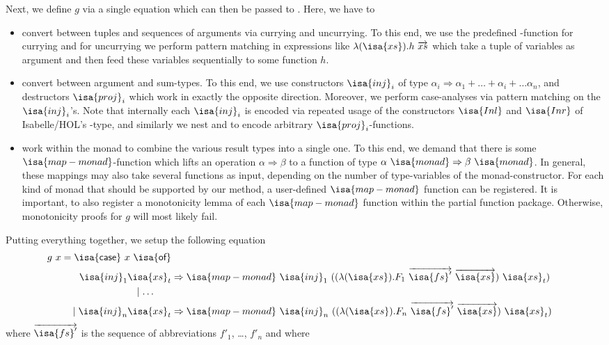\documentclass[11pt,a4paper]{article}
\newcommand\isakwd[1]{\textsf{\isa{#1}}}
\newcommand\parfun{\isakwd{partial-function}}
\newcommand\vect[1]{\overrightarrow{#1}}
\newcommand\fs{\isa{fs}}
\newcommand\xs{\isa{xs}}
\newcommand\xst{\isa{xs}_t}
\newcommand\cprod[1]{({#1})}
\newcommand\monad{\isa{monad}}
\newcommand\tto\Rightarrow
\newcommand\inj{\isa{inj}}
\newcommand\proj{\isa{proj}}
\newcommand\mapM{\isa{map-monad}}
\newcommand\curry{\isa{curry}}
\newcommand\case{\isakwd{case}}
\newcommand\of{\isakwd{of}}
\begin{document}
Next, we define $g$ via a single equation which can then be passed to \parfun. Here, 
we have to 
\begin{itemize}
\item convert between tuples and sequences of arguments via currying and uncurrying. 
  To this end, we use the predefined \curry-function for currying and for uncurrying we
  perform pattern matching in expressions like $\lambda \cprod{\xs}. h\ \vect{xs}$ which
  take a tuple of variables as argument and then feed these variables sequentially to 
  some function $h$.
\item convert between argument and sum-types. To this end, we use
  constructors $\inj_i$ of type $\alpha_i \tto \alpha_1 + \ldots + \alpha_i + \ldots \alpha_n$,
  and destructors $\proj_i$ which work in exactly the opposite direction. Moreover, we perform
  case-analyses via pattern matching on the $\inj_i$'s. Note that internally each $\inj_i$ is encoded
  via repeated usage of the constructors $\isa{Inl}$ and $\isa{Inr}$ of Isabelle/HOL's 
  -type, and similarly we
  nest  and  to encode arbitrary $\proj_i$-functions.
\item work within the monad to combine the various result types into a single one. 
  To this end,
  we demand that there is some $\mapM$-function which lifts an operation $\alpha \tto \beta$
  to a function of type $\alpha\ \monad \tto \beta\ \monad$. In general, these mappings may
  also take several functions as input, depending on the number of type-variables of the 
  monad-constructor. For each kind of monad that should be supported by our method,
  a user-defined $\mapM$ function can be registered. It is important, to also register a
  monotonicity lemma of each $\mapM$ function within the partial function package. Otherwise,
  monotonicity proofs for $g$ will most likely fail.
\end{itemize}
Putting everything together, we setup the following equation
\begin{align}
  g\ x = \case\ x\ \of \notag\\
    \inj_1 \xst & \tto \mapM\ \inj_1\ ((\lambda \cprod{\xs}. F_1\ \vect{\fs'}\ \vect\xs)\ \xst) \notag\\
   \mid \ldots\hspace{1.8em} \label{gsimp} \\
   \mid \inj_n \xst & \tto \mapM\ \inj_n\ ((\lambda \cprod{\xs}. F_n\ \vect{\fs'}\ \vect\xs)\ \xst)\notag
\end{align}
where $\vect{\fs'}$ is the sequence of abbreviations $f'_1$, \ldots, $f'_n$ and where
\end{document}
